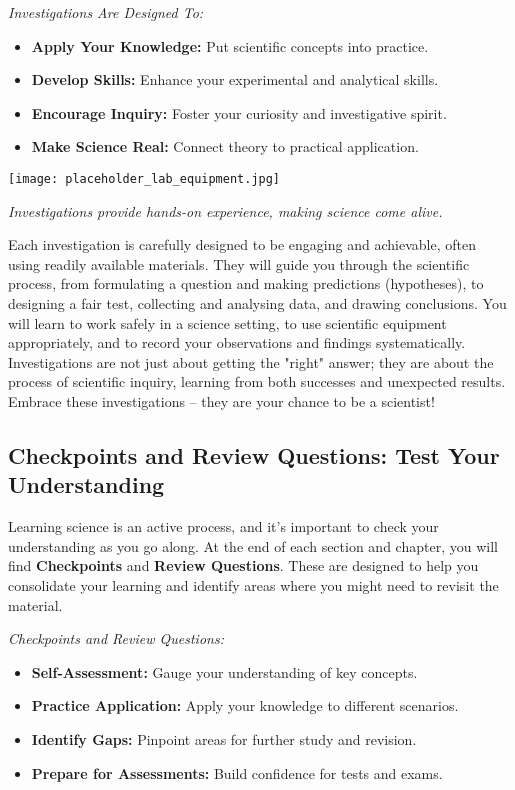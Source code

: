 \begin{marginnote}
\textit{Investigations Are Designed To:}
\begin{itemize}
    \item \textbf{Apply Your Knowledge:}  Put scientific concepts into practice.
    \item \textbf{Develop Skills:}  Enhance your experimental and analytical skills.
    \item \textbf{Encourage Inquiry:}  Foster your curiosity and investigative spirit.
    \item \textbf{Make Science Real:}  Connect theory to practical application.
\end{itemize}
\end{marginnote}

\begin{marginfigure}[0pt]
\texttt{[image: placeholder\_lab\_equipment.jpg]}
\caption*{}
\textit{Investigations provide hands-on experience, making science come alive.}
\end{marginfigure}

Each investigation is carefully designed to be engaging and achievable, often using readily available materials.  They will guide you through the scientific process, from formulating a question and making predictions (hypotheses), to designing a fair test, collecting and analysing data, and drawing conclusions.  You will learn to work safely in a science setting, to use scientific equipment appropriately, and to record your observations and findings systematically.  Investigations are not just about getting the "right" answer; they are about the process of scientific inquiry, learning from both successes and unexpected results.  Embrace these investigations – they are your chance to be a scientist!

\FloatBarrier

\subsection{Checkpoints and Review Questions: Test Your Understanding}

Learning science is an active process, and it's important to check your understanding as you go along.  At the end of each section and chapter, you will find \textbf{Checkpoints} and \textbf{Review Questions}.  These are designed to help you consolidate your learning and identify areas where you might need to revisit the material.

\begin{marginnote}
\textit{Checkpoints and Review Questions:}
\begin{itemize}
    \item \textbf{Self-Assessment:}  Gauge your understanding of key concepts.
    \item \textbf{Practice Application:}  Apply your knowledge to different scenarios.
    \item \textbf{Identify Gaps:}  Pinpoint areas for further study and revision.
    \item \textbf{Prepare for Assessments:}  Build confidence for tests and exams.
\end{itemize}
\end{marginnote}

